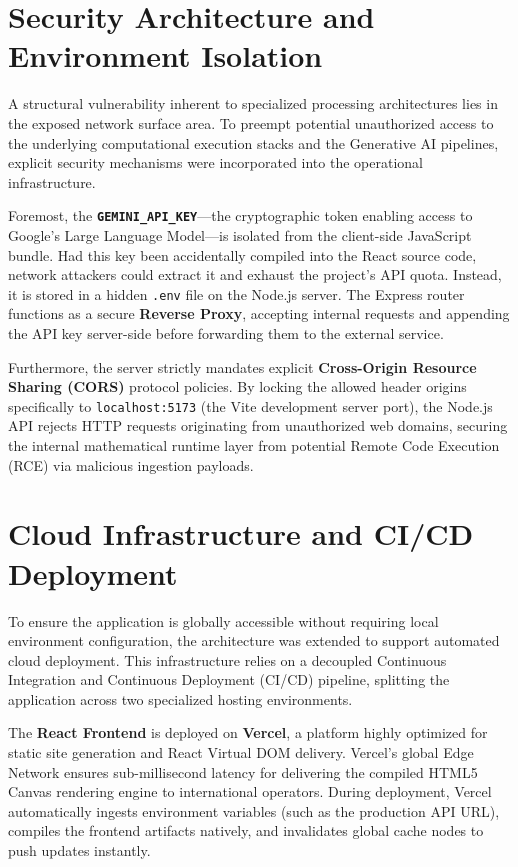 \section{Security Architecture and Environment Isolation}
A structural vulnerability inherent to specialized processing architectures lies in the exposed network surface area. To preempt potential unauthorized access to the underlying computational execution stacks and the Generative AI pipelines, explicit security mechanisms were incorporated into the operational infrastructure.

Foremost, the \textbf{\texttt{GEMINI\_API\_KEY}}---the cryptographic token enabling access to Google's Large Language Model---is isolated from the client-side JavaScript bundle. Had this key been accidentally compiled into the React source code, network attackers could extract it and exhaust the project's API quota. Instead, it is stored in a hidden \texttt{.env} file on the Node.js server. The Express router functions as a secure \textbf{Reverse Proxy}, accepting internal requests and appending the API key server-side before forwarding them to the external service.

Furthermore, the server strictly mandates explicit \textbf{Cross-Origin Resource Sharing (CORS)} protocol policies. By locking the allowed header origins specifically to \texttt{localhost:5173} (the Vite development server port), the Node.js API rejects HTTP requests originating from unauthorized web domains, securing the internal mathematical runtime layer from potential Remote Code Execution (RCE) via malicious ingestion payloads.

\section{Cloud Infrastructure and CI/CD Deployment}
To ensure the application is globally accessible without requiring local environment configuration, the architecture was extended to support automated cloud deployment. This infrastructure relies on a decoupled Continuous Integration and Continuous Deployment (CI/CD) pipeline, splitting the application across two specialized hosting environments.

The \textbf{React Frontend} is deployed on \textbf{Vercel}, a platform highly optimized for static site generation and React Virtual DOM delivery. Vercel's global Edge Network ensures sub-millisecond latency for delivering the compiled HTML5 Canvas rendering engine to international operators. During deployment, Vercel automatically ingests environment variables (such as the production API URL), compiles the frontend artifacts natively, and invalidates global cache nodes to push updates instantly.

